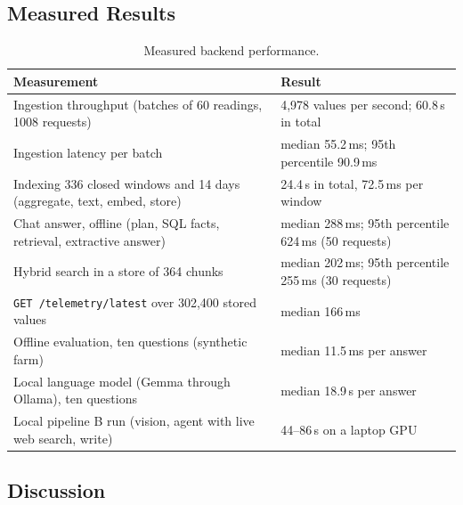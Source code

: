 \subsection{Measured Results}

\begin{table}[H]
\centering
\caption{Measured backend performance.}
\label{tab:perf}
\small
\begin{tabular}{|P{6.0cm}|P{6.8cm}|}
\hline
\textbf{Measurement} & \textbf{Result}\\\hline
Ingestion throughput (batches of 60 readings, 1008 requests) & 4,978 values per second; 60.8\,s in total\\\hline
Ingestion latency per batch & median 55.2\,ms; 95th percentile 90.9\,ms\\\hline
Indexing 336 closed windows and 14 days (aggregate, text, embed, store) & 24.4\,s in total, 72.5\,ms per window\\\hline
Chat answer, offline (plan, SQL facts, retrieval, extractive answer) & median 288\,ms; 95th percentile 624\,ms (50 requests)\\\hline
Hybrid search in a store of 364 chunks & median 202\,ms; 95th percentile 255\,ms (30 requests)\\\hline
\texttt{GET /telemetry/latest} over 302,400 stored values & median 166\,ms\\\hline
Offline evaluation, ten questions (synthetic farm) & median 11.5\,ms per answer\\\hline
Local language model (Gemma through Ollama), ten questions & median 18.9\,s per answer\\\hline
Local pipeline B run (vision, agent with live web search, write) & 44--86\,s on a laptop GPU\\\hline
\end{tabular}
\end{table}

\subsection{Discussion}

